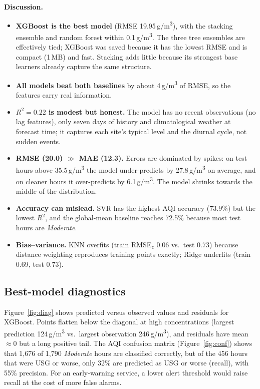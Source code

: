\documentclass[11pt,a4paper]{article}
\newcommand{\ugm}{\,\textmu g/m\textsuperscript{3}}
\begin{document}
\textbf{Discussion.}
\begin{itemize}
\item \textbf{XGBoost is the best model} (RMSE 19.95\ugm), with the stacking ensemble and random forest within 0.1\ugm{}. The three tree ensembles are effectively tied; XGBoost was saved because it has the lowest RMSE and is compact (1\,MB) and fast. Stacking adds little because its strongest base learners already capture the same structure.
\item \textbf{All models beat both baselines} by about 4\ugm{} of RMSE, so the features carry real information.
\item \textbf{$R^2 = 0.22$ is modest but honest.} The model has no recent observations (no lag features), only seven days of history and climatological weather at forecast time; it captures each site's typical level and the diurnal cycle, not sudden events.
\item \textbf{RMSE (20.0) $\gg$ MAE (12.3).} Errors are dominated by spikes: on test hours above 35.5\ugm{} the model under-predicts by 27.8\ugm{} on average, and on cleaner hours it over-predicts by 6.1\ugm. The model shrinks towards the middle of the distribution.
\item \textbf{Accuracy can mislead.} SVR has the highest AQI accuracy (73.9\%) but the lowest $R^2$, and the global-mean baseline reaches 72.5\% because most test hours are \emph{Moderate}.
\item \textbf{Bias--variance.} KNN overfits (train RMSE$_z$ 0.06 vs.\ test 0.73) because distance weighting reproduces training points exactly; Ridge underfits (train 0.69, test 0.73).
\end{itemize}

\subsection{Best-model diagnostics}
Figure~\ref{fig:diag} shows predicted versus observed values and residuals for XGBoost. Points flatten below the diagonal at high concentrations (largest prediction 124\ugm{} vs.\ largest observation 246\ugm), and residuals have mean $\approx 0$ but a long positive tail. The AQI confusion matrix (Figure~\ref{fig:conf}) shows that 1{,}676 of 1{,}790 \emph{Moderate} hours are classified correctly, but of the 456 hours that were USG or worse, only 32\% are predicted as USG or worse (recall), with 55\% precision. For an early-warning service, a lower alert threshold would raise recall at the cost of more false alarms.
\end{document}

